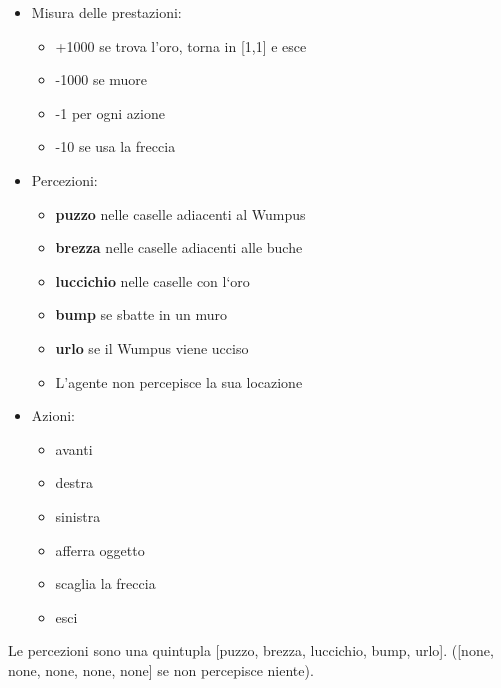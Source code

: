 \documentclass{article}
\begin{document}
\begin{itemize}
    \item Misura delle prestazioni:
    \begin{itemize}
        \item +1000 se trova l’oro, torna in [1,1] e esce
        \item -1000 se muore
        \item -1 per ogni azione
        \item -10 se usa la freccia
    \end{itemize}
    \item Percezioni:
    \begin{itemize}
        \item \textbf{puzzo} nelle caselle adiacenti al Wumpus
        \item \textbf{brezza} nelle caselle adiacenti alle buche
        \item \textbf{luccichio} nelle caselle con l‘oro
        \item \textbf{bump } se sbatte in un muro
        \item \textbf{urlo} se il Wumpus viene ucciso
        \item L’agente non percepisce la sua locazione
    \end{itemize}
    \item Azioni:
    \begin{itemize}
        \item avanti
        \item destra
        \item sinistra
        \item afferra oggetto
        \item scaglia la freccia
        \item esci
    \end{itemize}
\end{itemize}
Le percezioni sono una quintupla [puzzo, brezza, luccichio, bump, urlo]. ([none, none, none, none, none] se non percepisce niente).
\end{document}
